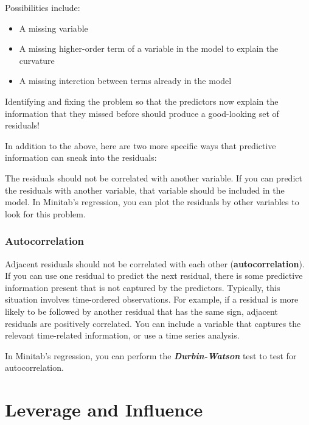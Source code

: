 \documentclass[12pt]{article}
\begin{document}
Possibilities include:

\begin{itemize}
\item A missing variable
\item A missing higher-order term of a variable in the model to explain the curvature
\item A missing interction between terms already in the model
\end{itemize}


Identifying and fixing the problem so that the predictors now explain the information that they missed before should produce a good-looking set of residuals!

In addition to the above, here are two more specific ways that predictive information can sneak into the residuals:

The residuals should not be correlated with another variable. If you can predict the residuals with another variable, that variable should be included in the model. In Minitab’s regression, you can plot the residuals by other variables to look for this problem.

\subsubsection{Autocorrelation} 
Adjacent residuals should not be correlated with each other (\textbf{autocorrelation}). If you can use one residual to predict the next residual, there is some predictive information present that is not captured by the predictors. Typically, this situation involves time-ordered observations. For example, if a residual is more likely to be followed by another residual that has the same sign, adjacent residuals are positively correlated. You can include a variable that captures the relevant time-related information, or use a time series analysis. 

In Minitab’s regression, you can perform the \textbf{\textit{Durbin-Watson} }test to test for autocorrelation.
\newpage
\section{Leverage and Influence}
\end{document}
